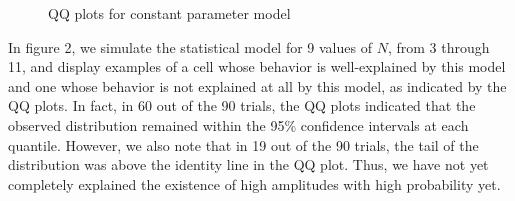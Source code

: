 \documentclass{article}
\begin{document}
\begin{figure}
  \hfill
  \caption{QQ plots for constant parameter model}
\end{figure}

In figure 2, we simulate the statistical model for 9 values of $N$, from 3 through 11, and display examples of a cell whose behavior is well-explained by this model and one whose behavior is not explained at all by this model, as indicated by the QQ plots. In fact, in 60 out of the 90 trials, the QQ plots indicated that the observed distribution remained within the 95\% confidence intervals at each quantile. However, we also note that in 19 out of the 90 trials, the tail of the distribution was above the identity line in the QQ plot. Thus, we have not yet completely explained the existence of high amplitudes with high probability yet.

%
\end{document}

